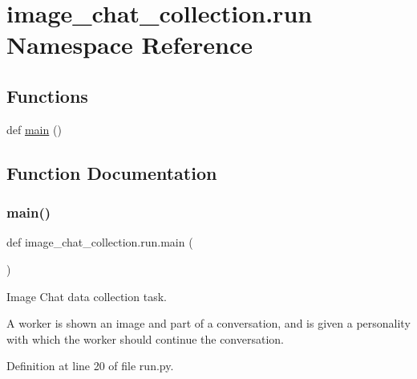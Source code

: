 \hypertarget{namespaceimage__chat__collection_1_1run}{}\section{image\+\_\+chat\+\_\+collection.\+run Namespace Reference}
\label{namespaceimage__chat__collection_1_1run}
\subsection*{Functions}
\begin{DoxyCompactItemize}
\item 
def \hyperlink{namespaceimage__chat__collection_1_1run_a703a00a419d81661c189b6603ab72769}{main} ()
\end{DoxyCompactItemize}


\subsection{Function Documentation}
\mbox{\label{namespaceimage__chat__collection_1_1run_a703a00a419d81661c189b6603ab72769}} 
\subsubsection{\texorpdfstring{main()}{main()}}
{\footnotesize\ttfamily def image\+\_\+chat\+\_\+collection.\+run.\+main (\begin{DoxyParamCaption}{ }\end{DoxyParamCaption})}

\begin{DoxyVerb}Image Chat data collection task.

A worker is shown an image and part of a conversation, and is given a personality
with which the worker should continue the conversation.
\end{DoxyVerb}
 

Definition at line 20 of file run.\+py.


